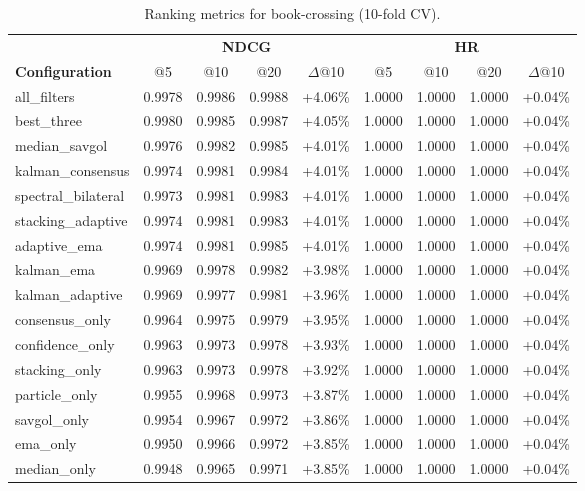 \begin{table}[htbp]
\centering
\caption{Ranking metrics for book-crossing (10-fold CV).}
\label{tab:ranking-book-crossing}
\begin{adjustbox}{max width=\textwidth}
\begin{tabular}{l cccc cccc}
\toprule
& \multicolumn{4}{c}{\textbf{NDCG}} & \multicolumn{4}{c}{\textbf{HR}} \\
\cmidrule(lr){2-5} \cmidrule(lr){6-9}
\textbf{Configuration} & @5 & @10 & @20 & $\Delta$@10 & @5 & @10 & @20 & $\Delta$@10 \\
\midrule
all\_filters & 0.9978 & 0.9986 & 0.9988 & +4.06\% & 1.0000 & 1.0000 & 1.0000 & +0.04\% \\
best\_three & 0.9980 & 0.9985 & 0.9987 & +4.05\% & 1.0000 & 1.0000 & 1.0000 & +0.04\% \\
median\_savgol & 0.9976 & 0.9982 & 0.9985 & +4.01\% & 1.0000 & 1.0000 & 1.0000 & +0.04\% \\
kalman\_consensus & 0.9974 & 0.9981 & 0.9984 & +4.01\% & 1.0000 & 1.0000 & 1.0000 & +0.04\% \\
spectral\_bilateral & 0.9973 & 0.9981 & 0.9983 & +4.01\% & 1.0000 & 1.0000 & 1.0000 & +0.04\% \\
stacking\_adaptive & 0.9974 & 0.9981 & 0.9983 & +4.01\% & 1.0000 & 1.0000 & 1.0000 & +0.04\% \\
adaptive\_ema & 0.9974 & 0.9981 & 0.9985 & +4.01\% & 1.0000 & 1.0000 & 1.0000 & +0.04\% \\
kalman\_ema & 0.9969 & 0.9978 & 0.9982 & +3.98\% & 1.0000 & 1.0000 & 1.0000 & +0.04\% \\
kalman\_adaptive & 0.9969 & 0.9977 & 0.9981 & +3.96\% & 1.0000 & 1.0000 & 1.0000 & +0.04\% \\
consensus\_only & 0.9964 & 0.9975 & 0.9979 & +3.95\% & 1.0000 & 1.0000 & 1.0000 & +0.04\% \\
confidence\_only & 0.9963 & 0.9973 & 0.9978 & +3.93\% & 1.0000 & 1.0000 & 1.0000 & +0.04\% \\
stacking\_only & 0.9963 & 0.9973 & 0.9978 & +3.92\% & 1.0000 & 1.0000 & 1.0000 & +0.04\% \\
particle\_only & 0.9955 & 0.9968 & 0.9973 & +3.87\% & 1.0000 & 1.0000 & 1.0000 & +0.04\% \\
savgol\_only & 0.9954 & 0.9967 & 0.9972 & +3.86\% & 1.0000 & 1.0000 & 1.0000 & +0.04\% \\
ema\_only & 0.9950 & 0.9966 & 0.9972 & +3.85\% & 1.0000 & 1.0000 & 1.0000 & +0.04\% \\
median\_only & 0.9948 & 0.9965 & 0.9971 & +3.85\% & 1.0000 & 1.0000 & 1.0000 & +0.04\% \\

\end{tabular}
\end{adjustbox}
\end{table}
